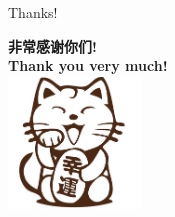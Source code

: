 \documentclass{beamer}
\begin{document}
\begin{frame}{Thanks!}
	\begin{center}
		\textbf{\cjkfont 非常感谢你们!} \\
		\textbf{Thank you very much!} \\
		\includegraphics[width=100pt]{cat.png}
	\end{center}
\end{frame}

\end{document}
